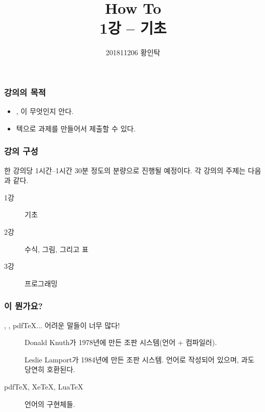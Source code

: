 

\usepackage{subfig}

\usepackage{tikz, pgfplots}
\usepackage{tkz-euclide}
\usepackage[american, cuteinductors]{circuitikz}
\usepackage{schemabloc}
\pgfplotsset{compat=newest}
\tikzexternalize

\title{How To \latex{} \\ \normalsize \textnormal{1강 -- \latex{} 기초}}
\author{201811206 황인탁}


\maketitle

\begin{frame}
    \frametitle{강의의 목적}

    \begin{itemize}
        \item \tex{}, \latex{}이 무엇인지 안다.
        \item 텍으로 과제를 만들어서 제출할 수 있다.
    \end{itemize}

\end{frame}

\begin{frame}
    \frametitle{강의 구성}

    한 강의당 1시간--1시간 30분 정도의 분량으로 진행될 예정이다. 각 강의의 주제는 다음과 같다.

    \begin{description}
        \item[1강] \latex{} 기초
        \item[2강] 수식, 그림, 그리고 표
        \item[3강] \latex{} 프로그래밍
    \end{description}

\end{frame}

\begin{frame}
    \frametitle{\tex{}이 뭔가요?}

    \tex{}, \latex{}, pdfTeX... 어려운 말들이 너무 많다!

    \begin{description}
        \item[\tex{}] Donald Knuth가 1978년에 만든 조판 시스템(언어 + 컴파일러).
        \item[\latex{}] Leslie Lamport가 1984년에 만든 조판 시스템. \tex{} 언어로 작성되어 있으며, \tex{}과도 당연히 호환된다.
        \item[pdfTeX, XeTeX, LuaTeX] \tex{} 언어의 구현체들.
    \end{description}

\end{frame}

